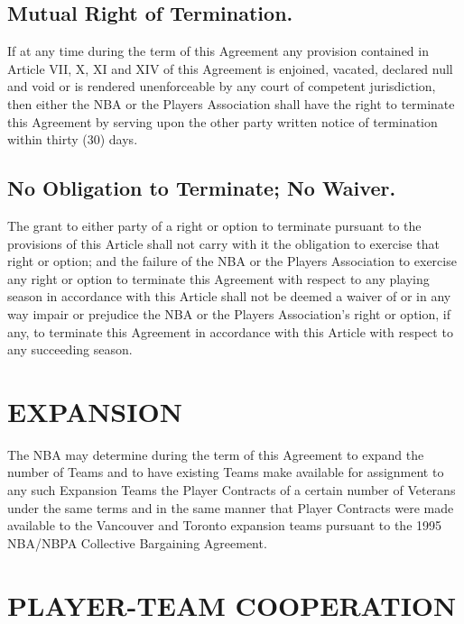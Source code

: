 \documentclass[
]{book}
\begin{document}
\hypertarget{mutual-right-of-termination.}{%
\section{Mutual Right of Termination.}\label{mutual-right-of-termination.}}

If at any time during the term of this Agreement any provision contained in Article VII, X, XI and XIV of this Agreement is enjoined, vacated, declared null and void or is rendered unenforceable by any court of competent jurisdiction, then either the NBA or the Players Association shall have the right to terminate this Agreement by serving upon the other party written notice of termination within thirty (30) days.

\hypertarget{no-obligation-to-terminate-no-waiver.}{%
\section{No Obligation to Terminate; No Waiver.}\label{no-obligation-to-terminate-no-waiver.}}

The grant to either party of a right or option to terminate pursuant to the provisions of this Article shall not carry with it the obligation to exercise that right or option; and the failure of the NBA or the Players Association to exercise any right or option to terminate this Agreement with respect to any playing season in accordance with this Article shall not be deemed a waiver of or in any way impair or prejudice the NBA or the Players Association's right or option, if any, to terminate this Agreement in accordance with this Article with respect to any succeeding season.

\hypertarget{expansion}{%
\chapter{EXPANSION}\label{expansion}}

The NBA may determine during the term of this Agreement to expand the number of Teams and to have existing Teams make available for assignment to any such Expansion Teams the Player Contracts of a certain number of Veterans under the same terms and in the same manner that Player Contracts were made available to the Vancouver and Toronto expansion teams pursuant to the 1995 NBA/NBPA Collective Bargaining Agreement.

\hypertarget{player-team-cooperation}{%
\chapter{PLAYER-TEAM COOPERATION}\label{player-team-cooperation}}
\end{document}
